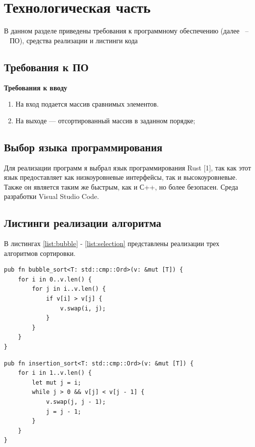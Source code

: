 \documentclass[a4paper,14pt, unknownkeysallowed]{extreport}
\begin{document}
\chapter{Технологическая часть}

В данном разделе приведены требования к программному обеспечению (далее ~--~ ПО), средства реализации и листинги кода

\section{Требования к ПО}

\textbf{Требования к вводу}
		
\begin{enumerate}
	\item На вход подается массив сравнимых элементов.
	\item На выходе --- отсортированный массив в заданном порядке;
\end{enumerate}

\section{Выбор языка программирования}
Для реализации программ я выбрал язык программирования Rust [1], так как этот язык предоставляет как низкоуровневые интерфейсы, так и высокоуровневые. Также он является таким же быстрым, как и С++, но более безопасен. Среда разработки Visual Studio Code.

\section{Листинги реализации алгоритма}

В листингах \ref{list:bubble} - \ref{list:selection} представлены реализации трех алгоритмов сортировки.

\begin{lstlisting}[label=list:bubble, caption=Функция сортировки массива методом пузырька]
pub fn bubble_sort<T: std::cmp::Ord>(v: &mut [T]) {
    for i in 0..v.len() {
        for j in i..v.len() {
            if v[i] > v[j] {
                v.swap(i, j);
            }
        }
    }
}
\end{lstlisting}

\begin{lstlisting}[label=list:insertion, caption=Функция сортировки массива методом вставок]
pub fn insertion_sort<T: std::cmp::Ord>(v: &mut [T]) {
    for i in 1..v.len() {
        let mut j = i;
        while j > 0 && v[j] < v[j - 1] {
            v.swap(j, j - 1);
            j = j - 1;
        }
    }
}
\end{lstlisting}
\end{document}

